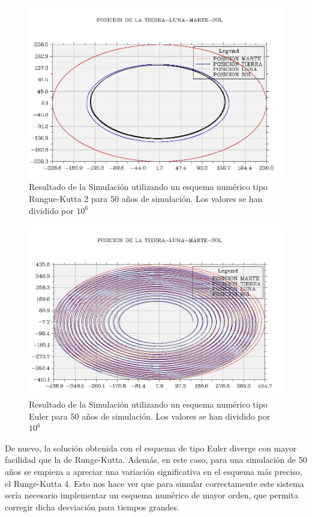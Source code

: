 \documentclass[11pt,singlespacing,liststotoc,headsepline,a4paper]{article}
\begin{document}
\begin{figure}[H]
	\centering
	\includegraphics[width=1\textwidth]{TLMS50A_RG2.jpg}
	\caption{Resultado de la Simulación utilizando un esquema numérico tipo Rungue-Kutta 2 para 50 años de simulación.  Los valores se han dividido por $10^{6}$}
	\label{TLMS50A_RG2}
\end{figure}

\begin{figure}[H]
	\centering
	\includegraphics[width=1\textwidth]{TLMS50A_EU.jpg}
	\caption{Resultado de la Simulación utilizando un esquema numérico tipo Euler para 50 años de simulación.  Los valores se han dividido por $10^{6}$}
	\label{TLMS50A_EU}
\end{figure}

De nuevo, la solución obtenida con el esquema de tipo Euler diverge con mayor facilidad que la de Runge-Kutta. Además, en este caso, para una simulación de 50 años se empieza a apreciar una variación significativa en el esquema más preciso, el Runge-Kutta 4. Esto nos hace ver que para simular correctamente este sistema sería necesario implementar un esquema numérico de mayor orden, que permita corregir dicha desviación para tiempos grandes.
	\newpage
	
\end{document}
